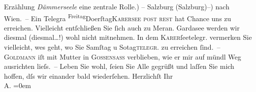 \begin{ledgroupsized}[t]{13cm}
{{{                  Erzählung \emph{Dämmerseele} eine zentrale Rolle.}}}\label{K_L01702_1h}) – Salzburg (Salzburg)–) nach Wien. –\pend
           \pstart
           Ein Telegra{\geminationm}{ }\substVorne{}\textsuperscript{Freitag}{\allowbreak}\substDazwischen{}Do{\geminationn}erſtag\substHinten{}{ }\textsc{Karersee post rest} hat Chance uns zu
               erreichen. Vielleicht entſchließen Sie ſich auch zu Meran. Gardasee werden wir diesmal
                  (diesmal{\dots}!) wohl nicht mitnehmen. In dem \textsc{Karer}ſeetelegr. vermerken Sie vielleicht, we{\geminationn}s geht, wo Sie Samſtag{ }{\pb}u So{\geminationn}tag\textsc{telegr.} zu erreichen ſind. –\pend
           \pstart
           \textsc{Goldmann} iſt mit Mutter in \textsc{Gossensass} verblieben, wie er mir auf mündl Weg ausrichten lieſs. –\pend
           \pstart
           Leben Sie wohl, ſeien Sie Alle gegrüßt und laſſen Sie mich hoffen, dſs wir einander
               bald wiederſehen.\pend
           \pstart
           Herzlichſt Ihr{\\[\baselineskip]}\spacefill\mbox{A.}\pend
           \leftskip=0em{}
         
         \endnumbering{}\end{ledgroupsized}  \newcommand{\dateiname}{L01702}\newcommand{\titel}{Arthur Schnitzler an Richard Beer-Hofmann, 25. 8. 1907}\newcommand{\editorInnen}{Martin Anton Müller und Gerd-Hermann Susen}
      